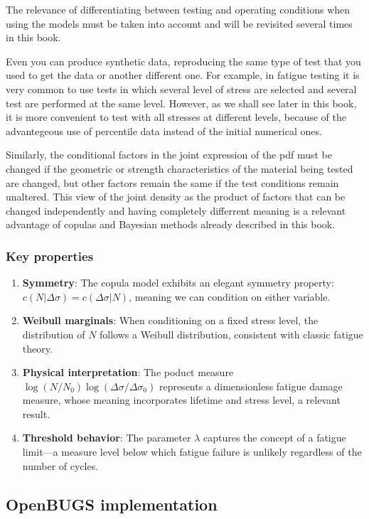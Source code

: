 The relevance of differentiating between testing and operating conditions when using the models must be taken into account and will be revisited several times in this book.

Even you can produce synthetic data, reproducing the same type of test that you used to get the data or another different one. For example, in fatigue testing it is very common to use tests in which several level of stress are selected and several test are performed at the same level. However, as we shall see later in this book, it is more convenient to test with all stresses at different levels, because of the advantegeous use of percentile data instead of the initial numerical ones.

Similarly, the conditional factors in the joint expression of the pdf must be changed if the geometric or strength characteristics of the material being tested are changed, but other factors remain the same if the test conditions remain unaltered. This view of the joint density as the product of factors that can be changed independently and having completely differrent meaning is a relevant advantage of copulas and Bayesian methods already described in this book.

\subsubsection*{Key properties}

\begin{enumerate}
\item \textbf{Symmetry}: The copula model exhibits an elegant symmetry property: $c(N|\Delta\sigma) = c(\Delta\sigma|N)$, meaning we can condition on either variable.
\item \textbf{Weibull marginals}: When conditioning on a fixed stress level, the distribution of $N$ follows a Weibull distribution, consistent with classic fatigue theory.
\item \textbf{Physical interpretation}: The poduct measure $\log(N/N_0)\log(\Delta\sigma/\Delta\sigma_0)$ represents a dimensionless fatigue damage measure, whose meaning incorporates lifetime and stress level, a relevant result.
\item \textbf{Threshold behavior}: The parameter $\lambda$ captures the concept of a fatigue limit—a measure level below which fatigue failure is unlikely regardless of the number of cycles.
\end{enumerate}

\subsection{OpenBUGS implementation}

